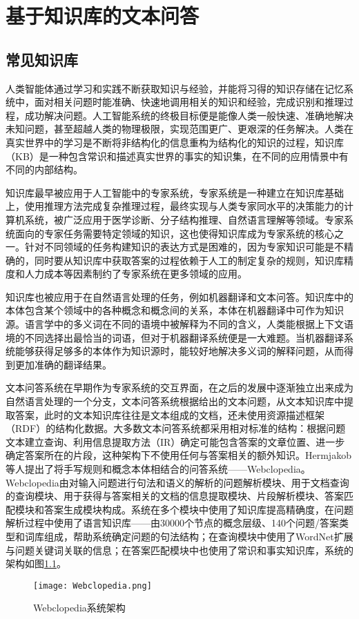 
\chapter{基于知识库的文本问答}
\section{常见知识库}

人类智能体通过学习和实践不断获取知识与经验，并能将习得的知识存储在记忆系统中，面对相关问题时能准确、快速地调用相关的知识和经验，完成识别和推理过程，成功解决问题。人工智能系统的终极目标便是能像人类一般快速、准确地解决未知问题，甚至超越人类的物理极限，实现范围更广、更艰深的任务解决。人类在真实世界中的学习是不断将非结构化的信息重构为结构化的知识的过程，知识库（KB）是一种包含常识和描述真实世界的事实的知识集，在不同的应用情景中有不同的内部结构。

知识库最早被应用于人工智能中的专家系统，专家系统是一种建立在知识库基础上，使用推理方法完成复杂推理过程，最终实现与人类专家同水平的决策能力的计算机系统，被广泛应用于医学诊断、分子结构推理、自然语言理解等领域。专家系统面向的专家任务需要特定领域的知识，这也使得知识库成为专家系统的核心之一。针对不同领域的任务构建知识的表达方式是困难的，因为专家知识可能是不精确的，同时要从知识库中获取答案的过程依赖于人工的制定复杂的规则，知识库精度和人力成本等因素制约了专家系统在更多领域的应用。

知识库也被应用于在自然语言处理的任务，例如机器翻译和文本问答。知识库中的本体包含某个领域中的各种概念和概念间的关系，本体在机器翻译中可作为知识源。语言学中的多义词在不同的语境中被解释为不同的含义，人类能根据上下文语境的不同选择出最恰当的词语，但对于机器翻译系统便是一大难题。当机器翻译系统能够获得足够多的本体作为知识源时，能较好地解决多义词的解释问题，从而得到更加准确的翻译结果。

文本问答系统在早期作为专家系统的交互界面，在之后的发展中逐渐独立出来成为自然语言处理的一个分支，文本问答系统根据给出的文本问题，从文本知识库中提取答案，此时的文本知识库往往是文本组成的文档，还未使用资源描述框架（RDF）的结构化数据。大多数文本问答系统都采用相对标准的结构：根据问题文本建立查询、利用信息提取方法（IR）确定可能包含答案的文章位置、进一步确定答案所在的片段，这种架构下不使用任何与答案相关的额外知识。Hermjakob等人提出了将手写规则和概念本体相结合的问答系统——Webclopedia。Webclopedia由对输入问题进行句法和语义的解析的问题解析模块、用于文档查询的查询模块、用于获得与答案相关的文档的信息提取模块、片段解析模块、答案匹配模块和答案生成模块构成。系统在多个模块中使用了知识库提高精确度，在问题解析过程中使用了语言知识库——由30000个节点的概念层级、140个问题/答案类型和词库组成，帮助系统确定问题的句法结构；在查询模块中使用了WordNet扩展与问题关键词关联的信息；在答案匹配模块中也使用了常识和事实知识库，系统的架构如图\ref{Webclopedia}。
\begin{figure}[H]
	\centering
	\texttt{[image: Webclopedia.png]}
	\caption{Webclopedia系统架构}
	\label{Webclopedia}
\end{figure}

